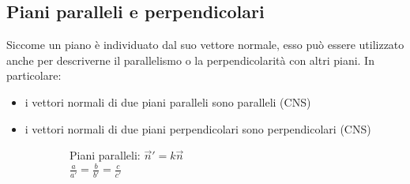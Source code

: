 \documentclass{article}     %
\begin{document}
        \subsection{Piani paralleli e perpendicolari}
            Siccome un piano è individuato dal suo vettore normale, esso può essere utilizzato anche per descriverne il parallelismo o la perpendicolarità con altri piani. In particolare:
            \begin{itemize}
                \item i vettori normali di due piani paralleli sono paralleli (CNS)
                \item i vettori normali di due piani perpendicolari sono perpendicolari (CNS)
            \end{itemize}
            \begin{figure}[h!]
                \centering
                \begin{subfigure}{0.49\textwidth}
                    \begin{center}
                    \end{center}
                    \caption{Piani paralleli: $\overrightarrow{n}'=k\overrightarrow{n}$\\ $\frac{a}{a'}=\frac{b}{b'}=\frac{c}{c'}$}
                \end{subfigure}
                \begin{subfigure}{0.49\textwidth}
                    \begin{center}
\end{center}
\end{subfigure}
\end{figure}
\end{document}
